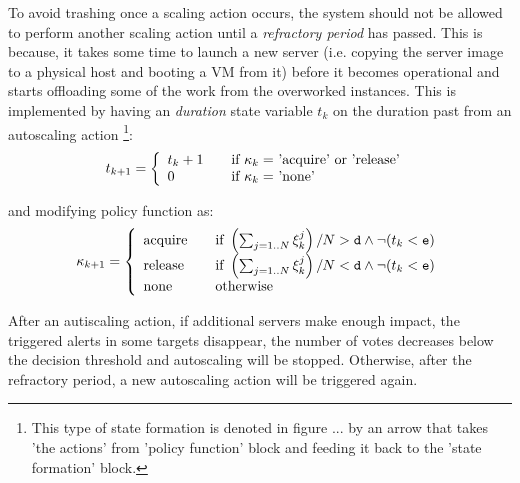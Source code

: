 To avoid trashing once a scaling action occurs, the system should not be allowed to perform another scaling action until a \textit{refractory period} has passed. This is because, it takes some time to launch a new server (i.e. copying the server image to a physical host and booting a VM from it) 
before it becomes operational and starts offloading some of the work from the overworked instances.
This is implemented by having an \textit{duration} state variable $t_k$ on the duration past from an autoscaling action \footnote{This type of state formation is denoted in figure ... by an arrow that takes 'the actions' from 'policy function' block and feeding it back to the  'state formation' block. }:    
\[
  t_{k+1} = \left\{ 
  \begin{array}{l l}
    t_k+1 & \quad \text{if $\kappa_{k}=$ 'acquire' or 'release' }\\
    0 & \quad \text{if $\kappa_{k}=$ 'none' }\\
  \end{array} \right.
\]

and modifying policy function as: 
\[
  \kappa_{k+1} = \left\{ 
  \begin{array}{l l}
    \text{acquire} & \quad \text{if } \left(\sum_{j=1..N} \xi^{j}_k\right)/N > \mathtt{d}  \wedge \neg( t_k < \mathtt{e} )\\
    \text{release} & \quad \text{if } \left(\sum_{j=1..N} \xi^{j}_k\right)/N < \mathtt{d} \wedge \neg( t_k < \mathtt{e} ) \\
    \text{none} & \quad \text{otherwise} 
  \end{array} \right. 
\]

After an autiscaling action, if additional servers make enough impact, the triggered alerts in some targets disappear, the number of votes decreases below the decision threshold and autoscaling will be stopped. Otherwise, after the refractory period, a new autoscaling action will be triggered again. 


%
%

